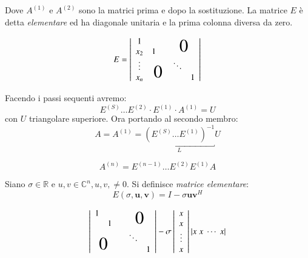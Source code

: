 Dove  $A^{(1)}$ e $A^{(2)}$ sono la matrici prima e dopo la sostituzione.
La matrice $E$ \`e detta \emph{elementare} ed ha diagonale unitaria e la
prima colonna diversa da zero.

\[
E = \left |
\begin{array}{ccccc}
1      &   &  & \multicolumn{2}{c}{\multirow{2}{*}{\huge $0$}}      \\
x_2    & 1 &  &                                                     \\
\vdots & \multicolumn{2}{c}{\multirow{2}{*}{\huge $0$}} & \ddots &  \\
x_n    &   &  & &1
\end{array}
\right |
\]

Facendo i passi sequenti avremo:
$$ E^{(S)} \ldots E^{(2)} \cdot E^{(1)} \cdot A^{(1)} = U $$
con $U$ triangolare superiore.
Ora portando al secondo membro:
$$ A = A^{(1)} = \underbracket{(E^{(S)} \ldots E^{(1)})^{-1}}_{L} U $$


$$ A^{(n)} = E^{(n-1)}\ldots E^{(2)} E^{(1)}A$$
\begin{defn}
Siano $\sigma \in \mathbb{R}$ e $u,v \in \mathbb{C}^n, u,v, \neq
0$. Si definisce \emph{matrice elementare}:
$$ E(\sigma, \mathbf{u},\mathbf{v}) = 
   I - \sigma \mathbf{uv}^{H} $$


\[\left | \begin{array}{ccccc}
    1  &   &  & \multicolumn{2}{c}{\multirow{2}{*}{\huge $0$}}      \\
       & 1 &  &                                                     \\
    \multicolumn{2}{c}{\multirow{2}{*}{\huge $0$}}  &   & \ddots &  \\
       &  & & & 1
\end{array} \right |
-\sigma
\left | \begin{array}{c}
    x \\
    x \\
    \vdots \\
    x
\end{array} \right |
|x \; x \; \cdots \; x|
\]
\end{defn}

